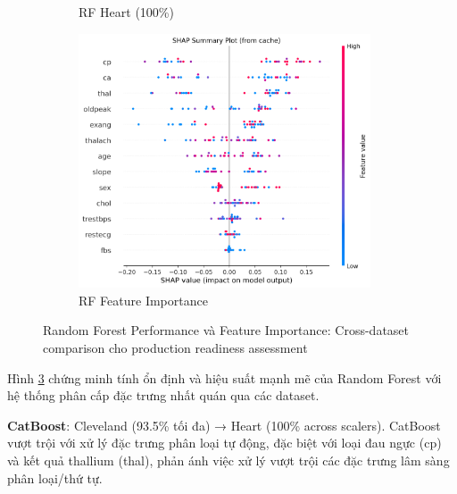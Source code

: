 \begin{figure}[H]
\begin{subfigure}[b]{0.31\textwidth}
\caption{RF Heart (100\%)}
\label{fig:ra-rf_performance_heart}
\end{subfigure}
\hfill
\begin{subfigure}[b]{0.31\textwidth}
\centering
\includegraphics[width=0.95\textwidth]{Result/cleveland_dataset/RF/SHAP/Summary.png}
\caption{RF Feature Importance}
\label{fig:ra-rf_shap_summary}
\end{subfigure}
\caption{Random Forest Performance và Feature Importance: Cross-dataset comparison cho production readiness assessment}
\label{fig:ra-rf_cross_dataset}
\end{figure}

Hình \ref{fig:ra-rf_cross_dataset} chứng minh tính ổn định và hiệu suất mạnh mẽ của Random Forest với hệ thống phân cấp đặc trưng nhất quán qua các dataset.

\textbf{CatBoost}: Cleveland (93.5\% tối đa) → Heart (100\% across scalers). CatBoost vượt trội với xử lý đặc trưng phân loại tự động, đặc biệt với loại đau ngực (cp) và kết quả thallium (thal), phản ánh việc xử lý vượt trội các đặc trưng lâm sàng phân loại/thứ tự.

